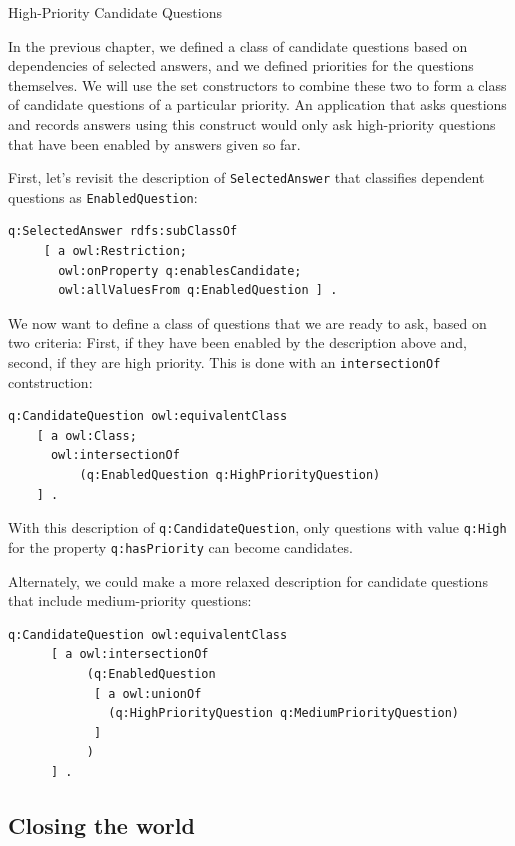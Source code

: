 \begin{example}{High-Priority Candidate Questions}

In the previous chapter, we defined a class of candidate questions based
on dependencies of selected answers, and we defined priorities for the
questions themselves. We will use the set constructors to combine these
two to form a class of candidate questions of a particular priority. An
application that asks questions and records answers using this construct
would only ask high-priority questions that have been enabled by answers
given so far.

First, let's revisit the description of \texttt{SelectedAnswer} that classifies
dependent questions as
\texttt{EnabledQuestion}:

\begin{lstlisting}
q:SelectedAnswer rdfs:subClassOf
     [ a owl:Restriction;
       owl:onProperty q:enablesCandidate;
       owl:allValuesFrom q:EnabledQuestion ] .
\end{lstlisting}

We now want to define a class of questions that we are ready to ask,
based on two criteria: First, if they have been enabled by the
description above and, second, if they are high priority. This is done
with an \texttt{intersectionOf} contstruction:

\begin{lstlisting}
q:CandidateQuestion owl:equivalentClass
    [ a owl:Class;
      owl:intersectionOf
          (q:EnabledQuestion q:HighPriorityQuestion)
    ] .
\end{lstlisting}

With this description of \texttt{q:CandidateQuestion}, only questions with value
\texttt{q:High} for the property
\texttt{q:hasPriority} can become candidates.

Alternately, we could make a more relaxed description for candidate
questions that include medium-priority questions:

\begin{lstlisting}
q:CandidateQuestion owl:equivalentClass
      [ a owl:intersectionOf
           (q:EnabledQuestion
            [ a owl:unionOf
              (q:HighPriorityQuestion q:MediumPriorityQuestion) 
            ]
           )
      ] .
\end{lstlisting}
\end{example}

\subsection{Closing the world}

